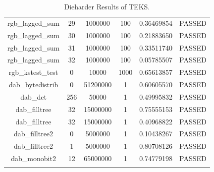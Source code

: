 \begin{longtable}{cccccc}
rgb\_lagged\_sum & 29 & 1000000 & 100 & 0.36469854 & PASSED \\
rgb\_lagged\_sum & 30 & 1000000 & 100 & 0.21883650 & PASSED \\
rgb\_lagged\_sum & 31 & 1000000 & 100 & 0.33511740 & PASSED \\
rgb\_lagged\_sum & 32 & 1000000 & 100 & 0.05785507 & PASSED \\
rgb\_kstest\_test & 0 & 10000 & 1000 & 0.65613857 & PASSED \\
dab\_bytedistrib & 0 & 51200000 & 1 & 0.60605570 & PASSED \\
dab\_dct & 256 & 50000 & 1 & 0.49995832 & PASSED \\
dab\_filltree & 32 & 15000000 & 1 & 0.75555153 & PASSED \\
dab\_filltree & 32 & 15000000 & 1 & 0.40968822 & PASSED \\
dab\_filltree2 & 0 & 5000000 & 1 & 0.10438267 & PASSED \\
dab\_filltree2 & 1 & 5000000 & 1 & 0.80708126 & PASSED \\
dab\_monobit2 & 12 & 65000000 & 1 & 0.74779198 & PASSED \\
\bottomrule
\caption{Dieharder Results of TEKS.}
\label{table}
\end{longtable}

